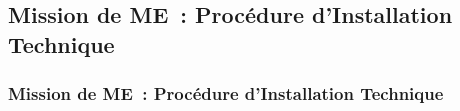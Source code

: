 \subsection{Mission de ME~: Procédure d'Installation Technique}
\begin{frame}
	\frametitle{Mission de ME~: Procédure d'Installation Technique}
\end{frame}


